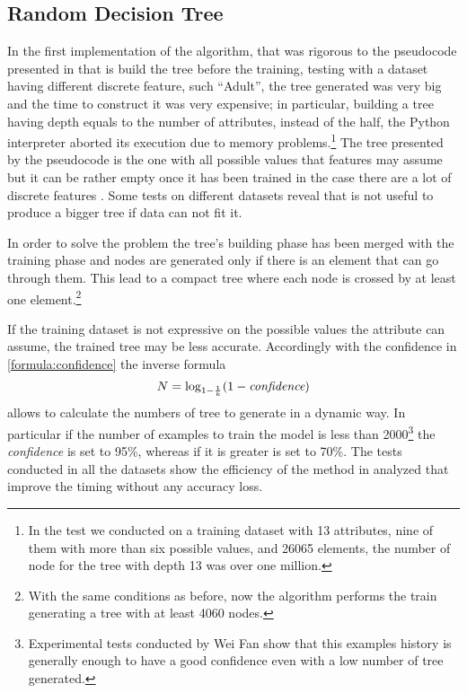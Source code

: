 \documentclass{acm_proc_article-sp-sigmod07}
\begin{document}
\subsection{Random Decision Tree}
In the first implementation of the algorithm, that was rigorous to the
pseudocode presented in \cite{fan:rdt} that is build the tree before the
training, testing with a dataset having different discrete feature, such
``Adult'', the tree generated was very big and the time to construct it was
very expensive; in particular, building a tree having depth equals to the
number of attributes, instead of the half, the Python interpreter
aborted its execution due to memory problems.\footnote{In the test we
conducted on a training dataset with 13 attributes, nine of them with
more than six possible values, and 26065 elements, the number of node for
the tree with depth 13 was over one million.}
The tree presented by the pseudocode is the one with all possible values
that features may assume but it can be rather empty once it has been
trained in the case there are a lot of discrete features . Some tests
on different datasets reveal that is not useful to produce a bigger tree if
data can not fit it.

In order to solve the problem the tree's building phase has been merged
with the training phase and nodes are generated only if there is an element
that can go through them. This lead to a compact tree where
each node is crossed by at least one element.\footnote{With the same
conditions as before, now the algorithm performs the train generating a
tree with at least 4060 nodes.}

If the training dataset is not expressive on the possible values
the attribute can assume, the trained tree may be less accurate.
Accordingly with the confidence in \ref{formula:confidence} the inverse
formula
\begin{equation}
\label{formula:N_generate}
N = \log_{1-\frac{1}{k}}({1 - \emph{confidence}})
\end{equation}
allows to calculate the numbers of tree to generate in a dynamic way. In
 particular if the number of examples to train the model is less than
2000\footnote{Experimental tests conducted by Wei Fan show that this
examples history is generally enough to have a good confidence even with a
low number of tree generated.} the \emph{confidence} is set to 95\%,
whereas if it is greater is set to 70\%. The tests conducted in all the
datasets show the efficiency of the method in analyzed that improve the
timing without any accuracy loss.
\end{document}
